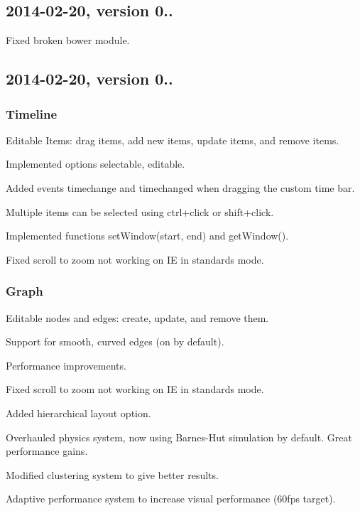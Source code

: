 \subsection*{2014-\/02-\/20, version 0..}


\begin{DoxyItemize}
\item Fixed broken bower module.
\end{DoxyItemize}

\subsection*{2014-\/02-\/20, version 0..}

\subsubsection*{Timeline}


\begin{DoxyItemize}
\item Editable Items\+: drag items, add new items, update items, and remove items.
\item Implemented options {\ttfamily selectable}, {\ttfamily editable}.
\item Added events {\ttfamily timechange} and {\ttfamily timechanged} when dragging the custom time bar.
\item Multiple items can be selected using ctrl+click or shift+click.
\item Implemented functions {\ttfamily set\+Window(start, end)} and {\ttfamily get\+Window()}.
\item Fixed scroll to zoom not working on IE in standards mode.
\end{DoxyItemize}

\subsubsection*{Graph}


\begin{DoxyItemize}
\item Editable nodes and edges\+: create, update, and remove them.
\item Support for smooth, curved edges (on by default).
\item Performance improvements.
\item Fixed scroll to zoom not working on IE in standards mode.
\item Added hierarchical layout option.
\item Overhauled physics system, now using Barnes-\/\+Hut simulation by default. Great performance gains.
\item Modified clustering system to give better results.
\item Adaptive performance system to increase visual performance (60fps target).
\end{DoxyItemize}

